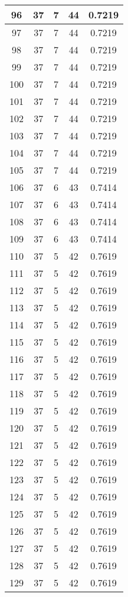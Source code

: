 \documentclass[letterpaper, 12pt]{article}
\begin{document}
\begin{longtable}{|c|c|c|c|c|}
\hline
96 & 37 & 7 & 44 & 0.7219 \\
\hline
97 & 37 & 7 & 44 & 0.7219 \\
\hline
98 & 37 & 7 & 44 & 0.7219 \\
\hline
99 & 37 & 7 & 44 & 0.7219 \\
\hline
100 & 37 & 7 & 44 & 0.7219 \\
\hline
101 & 37 & 7 & 44 & 0.7219 \\
\hline
102 & 37 & 7 & 44 & 0.7219 \\
\hline
103 & 37 & 7 & 44 & 0.7219 \\
\hline
104 & 37 & 7 & 44 & 0.7219 \\
\hline
105 & 37 & 7 & 44 & 0.7219 \\
\hline
106 & 37 & 6 & 43 & 0.7414 \\
\hline
107 & 37 & 6 & 43 & 0.7414 \\
\hline
108 & 37 & 6 & 43 & 0.7414 \\
\hline
109 & 37 & 6 & 43 & 0.7414 \\
\hline
110 & 37 & 5 & 42 & 0.7619 \\
\hline
111 & 37 & 5 & 42 & 0.7619 \\
\hline
112 & 37 & 5 & 42 & 0.7619 \\
\hline
113 & 37 & 5 & 42 & 0.7619 \\
\hline
114 & 37 & 5 & 42 & 0.7619 \\
\hline
115 & 37 & 5 & 42 & 0.7619 \\
\hline
116 & 37 & 5 & 42 & 0.7619 \\
\hline
117 & 37 & 5 & 42 & 0.7619 \\
\hline
118 & 37 & 5 & 42 & 0.7619 \\
\hline
119 & 37 & 5 & 42 & 0.7619 \\
\hline
120 & 37 & 5 & 42 & 0.7619 \\
\hline
121 & 37 & 5 & 42 & 0.7619 \\
\hline
122 & 37 & 5 & 42 & 0.7619 \\
\hline
123 & 37 & 5 & 42 & 0.7619 \\
\hline
124 & 37 & 5 & 42 & 0.7619 \\
\hline
125 & 37 & 5 & 42 & 0.7619 \\
\hline
126 & 37 & 5 & 42 & 0.7619 \\
\hline
127 & 37 & 5 & 42 & 0.7619 \\
\hline
128 & 37 & 5 & 42 & 0.7619 \\
\hline
129 & 37 & 5 & 42 & 0.7619 \\

\end{longtable}
\end{document}
